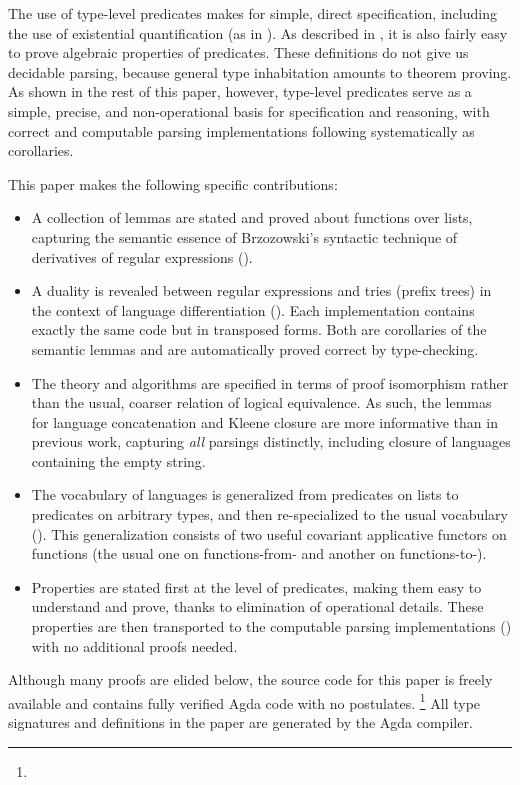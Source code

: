 \documentclass[acmsmall,screen,timestamp]{acmart}  %
\begin{document}
The use of type-level predicates makes for simple, direct specification, including the use of existential quantification (as in ).
As described in , it is also fairly easy to prove algebraic properties of predicates.
These definitions do not give us decidable parsing, because general type inhabitation amounts to theorem proving.
As shown in the rest of this paper, however, type-level predicates serve as a simple, precise, and non-operational basis for specification and reasoning, with correct and computable parsing implementations following systematically as corollaries.

This paper makes the following specific contributions:
\begin{itemize}
\item
  A collection of lemmas are stated and proved about functions over lists, capturing the semantic essence of Brzozowski's syntactic technique of derivatives of regular expressions ().
\item
  A duality is revealed between regular expressions and tries (prefix trees) in the context of language differentiation ().
  Each implementation contains exactly the same code but in transposed forms.
  Both are corollaries of the semantic lemmas and are automatically proved correct by type-checking.
\item
  The theory and algorithms are specified in terms of proof isomorphism rather than the usual, coarser relation of logical equivalence.
  As such, the lemmas for language concatenation and Kleene closure are more informative than in previous work, capturing \emph{all} parsings distinctly, including closure of languages containing the empty string.
\item
  The vocabulary of languages is generalized from predicates on lists to predicates on arbitrary types, and then re-specialized to the usual vocabulary ().
  This generalization consists of two useful covariant applicative functors on functions (the usual one on functions-from- and another on functions-to-).
\item
  Properties are stated first at the level of predicates, making them easy to understand and prove, thanks to elimination of operational details.
  These properties are then transported to the computable parsing implementations () with no additional proofs needed.
\end{itemize}
Although many proofs are elided below, the source code for this paper is freely available and contains fully verified Agda code with no postulates.%
\ifacm\else
\footnote{\protect\repoURL}
\fi{}
All type signatures and definitions in the paper are generated by the Agda compiler.
\end{document}
